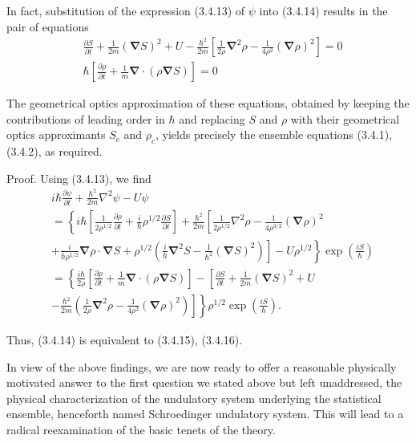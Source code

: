\documentclass{article}
\begin{document}
In fact, substitution of the expression (3.4.13) of $\psi$ into (3.4.14) results in the pair of equations
$$
\begin{align*}
& \frac{\partial S}{\partial t}+\frac{1}{2 m}(\boldsymbol{\nabla} S)^{2}+U-\frac{\hbar^{2}}{2 m}\left[\frac{1}{2 \rho} \boldsymbol{\nabla}^{2} \rho-\frac{1}{4 \rho^{2}}(\boldsymbol{\nabla} \rho)^{2}\right]=0  \tag{3.4.15}\\
& \hbar\left[\frac{\partial \rho}{\partial t}+\frac{1}{m} \boldsymbol{\nabla} \cdot(\rho \boldsymbol{\nabla} S)\right]=0 \tag{3.4.16}
\end{align*}
$$

The geometrical optics approximation of these equations, obtained by keeping the contributions of leading order in $\hbar$ and replacing $S$ and $\rho$ with their geometrical optics approximants $S_{c}$ and $\rho_{c}$, yields precisely the ensemble equations (3.4.1), (3.4.2), as required.

Proof. Using (3.4.13), we find
$$
\begin{align*}
& i \hbar \frac{\partial \psi}{\partial t}+\frac{\hbar^{2}}{2 m} \nabla^{2} \psi-U \psi  \tag{3.4.17}\\
& =\left\{i \hbar\left[\frac{1}{2 \rho^{1 / 2}} \frac{\partial \rho}{\partial t}+\frac{i}{\hbar} \rho^{1 / 2} \frac{\partial S}{\partial t}\right]+\frac{\hbar^{2}}{2 m}\left[\frac{1}{2 \rho^{1 / 2}} \nabla^{2} \rho-\frac{1}{4 \rho^{3 / 2}}(\boldsymbol{\nabla} \rho)^{2}\right.\right. \\
& \left.\left.+\frac{i}{\hbar \rho^{1 / 2}} \boldsymbol{\nabla} \rho \cdot \boldsymbol{\nabla} S+\rho^{1 / 2}\left(\frac{i}{\hbar} \boldsymbol{\nabla}^{2} S-\frac{1}{\hbar^{2}}(\boldsymbol{\nabla} S)^{2}\right)\right]-U \rho^{1 / 2}\right\} \exp \left(\frac{i S}{\hbar}\right) \\
& =\left\{\frac{i \hbar}{2 \rho}\left[\frac{\partial \rho}{\partial t}+\frac{1}{m} \boldsymbol{\nabla} \cdot(\rho \boldsymbol{\nabla} S)\right]-\left[\frac{\partial S}{\partial t}+\frac{1}{2 m}(\boldsymbol{\nabla} S)^{2}+U\right.\right. \\
& \left.\left.-\frac{\hbar^{2}}{2 m}\left(\frac{1}{2 \rho} \boldsymbol{\nabla}^{2} \rho-\frac{1}{4 \rho^{2}}(\boldsymbol{\nabla} \rho)^{2}\right)\right]\right\} \rho^{1 / 2} \exp \left(\frac{i S}{\hbar}\right) .
\end{align*}
$$

Thus, (3.4.14) is equivalent to (3.4.15), (3.4.16).

In view of the above findings, we are now ready to offer a reasonable physically motivated answer to the first question we stated above but left unaddressed, the physical characterization of the undulatory system underlying the statistical ensemble, henceforth named Schroedinger undulatory system. This will lead to a radical reexamination of the basic tenets of the theory.
\end{document}
